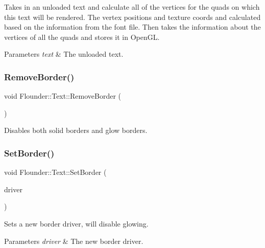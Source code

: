 Takes in an unloaded text and calculate all of the vertices for the quads on which this text will be rendered. The vertex positions and texture coords and calculated based on the information from the font file. Then takes the information about the vertices of all the quads and stores it in Open\+GL. 


\begin{DoxyParams}{Parameters}
{\em text} & The unloaded text. \\
\hline
\end{DoxyParams}
\mbox{\label{class_flounder_1_1_text_a499012b71bd5a65b47ead39cd319460b}} 
\subsubsection{\texorpdfstring{Remove\+Border()}{RemoveBorder()}}
{\footnotesize\ttfamily void Flounder\+::\+Text\+::\+Remove\+Border (\begin{DoxyParamCaption}{ }\end{DoxyParamCaption})}



Disables both solid borders and glow borders. 

\mbox{\label{class_flounder_1_1_text_a506f5faba4da116887020cd4d79858ba}} 
\subsubsection{\texorpdfstring{Set\+Border()}{SetBorder()}}
{\footnotesize\ttfamily void Flounder\+::\+Text\+::\+Set\+Border (\begin{DoxyParamCaption}\item[{\hyperlink{class_flounder_1_1_i_driver}{I\+Driver} $\ast$}]{driver }\end{DoxyParamCaption})}



Sets a new border driver, will disable glowing. 


\begin{DoxyParams}{Parameters}
{\em driver} & The new border driver. \\
\hline
\end{DoxyParams}
\mbox{\label{class_flounder_1_1_text_af8312b2ea53e4a3c4d1a853915e48c98}} 
